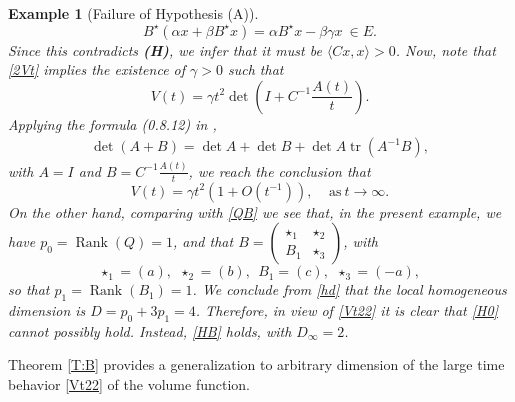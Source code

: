 \documentclass[11pt,letter]{amsart}
\numberwithin{equation}{section}
\newcommand{\tr}{\operatorname{tr}}
\newcommand{\sa}{\langle}
\newcommand{\da}{\rangle}
\newtheorem{example}[theorem]{Example}
\numberwithin{equation}{section}
\begin{document}
\begin{example}[Failure of Hypothesis (A)]
{\[
B^\star(\alpha x + \beta B^\star x) = \alpha B^\star x -\beta \gamma x\ \in E.
\]  
Since this contradicts \textbf{(H)}, we infer that it must be $\sa Cx,x\da>0$.
Now, note that \eqref{2Vt} implies the existence of $\gamma>0$ such that
\[
V(t) = \gamma t^2 \det(I + C^{-1} \frac{A(t)}t).
\]
Applying the formula (0.8.12) in \cite{HJ}, 
\begin{align}\label{det2}
\det (A+B)= \det A + \det B + \det A \tr(A^{-1}B),
\end{align}
with $A = I$ and $B = C^{-1} \frac{A(t)}t$, we reach the conclusion that
\begin{equation}\label{Vt22}
V(t) = \gamma t^2 (1 + O(t^{-1})),\ \ \ \ \ \text{as}\ t\to \infty.
\end{equation}
On the other hand, comparing with \eqref{QB} we see that, in the present example, we have $p_0 = \operatorname{Rank}(Q) = 1$, and that $B = \begin{pmatrix} \star_1 & \star_2\\ B_1& \star_3\end{pmatrix}$, with  
\[
\star_1 = (a),\ \ \star_2 = (b),\ \  B_1 = (c),\ \ \star_3 = (-a),
\]
so that $p_1 = \operatorname{Rank}(B_1) = 1$.
We conclude from \eqref{hd} that the local homogeneous dimension is $D = p_0 + 3 p_1 = 4$.
Therefore, in view of \eqref{Vt22} it is clear that \eqref{H0} cannot possibly hold. Instead, \eqref{HB} holds, with $D_\infty = 2$.}

\end{example}

Theorem \ref{T:B} provides a generalization to arbitrary dimension of the large time behavior \eqref{Vt22} of the volume function. 

\vskip 0.2in
\end{document}
